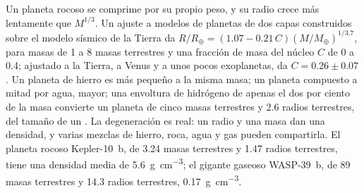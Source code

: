 Un planeta rocoso se comprime por su propio peso, y su radio crece
más lentamente que $M^{1/3}$. Un ajuste a modelos de planetas de dos capas construidos sobre
el modelo sísmico de la Tierra da $R/R_\oplus = (1.07 - 0.21\,C)
(M/M_\oplus)^{1/3.7}$, para masas de 1 a 8 masas terrestres y una fracción de masa del núcleo
$C$ de 0 a 0.4; ajustado a la Tierra, a Venus y a unos pocos
exoplanetas, da $C = 0.26 \pm 0.07$. Un
planeta de hierro es más pequeño a la misma masa; un planeta compuesto a mitad por agua, mayor;
una envoltura de hidrógeno de apenas el dos por ciento de la masa convierte un planeta de
cinco masas terrestres y \num{2.6} radios terrestres, del tamaño de un
. La degeneración es real: un radio y una masa dan una
densidad, y varias mezclas de hierro, roca, agua y gas pueden compartirla.
El planeta rocoso Kepler-10~b, de 3.24 masas terrestres y 1.47 radios terrestres,
tiene una densidad media de \qty{5.6}{g.cm^{-3}}; el gigante gaseoso WASP-39~b,
de 89 masas terrestres y 14.3 radios terrestres, \qty{0.17}{g.cm^{-3}}.

